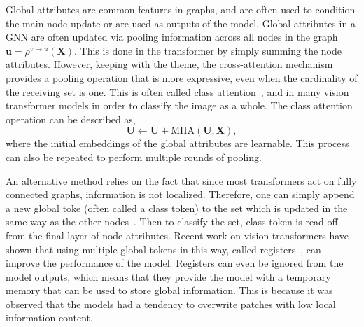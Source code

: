 Global attributes are common features in graphs, and are often used to condition the main node update or are used as outputs of the model.
Global attributes in a GNN are often updated via pooling information across all nodes in the graph $ \mathbf{u} = \rho^{v \to u}(\mathbf{X})$.
This is done in the transformer by simply summing the node attributes.
However, keeping with the theme, the cross-attention mechanism provides a pooling operation that is more expressive, even when the cardinality of the receiving set is one.
This is often called class attention~, and in many vision transformer models in order to classify the image as a whole.
The class attention operation can be described as,
\begin{equation}
    \mathbf{U} \leftarrow \mathbf{U} + \text{MHA}(\mathbf{U}, \mathbf{X}),
\end{equation}
where the initial embeddings of the global attributes are learnable.
This process can also be repeated to perform multiple rounds of pooling.

An alternative method relies on the fact that since most transformers act on fully connected graphs, information is not localized.
Therefore, one can simply append a new global toke (often called a class token) to the set which is updated in the same way as the other nodes~.
Then to classify the set, class token is read off from the final layer of node attributes.
Recent work on vision transformers have shown that using multiple global tokens in this way, called registers~, can improve the performance of the model.
Registers can even be ignored from the model outputs, which means that they provide the model with a temporary memory that can be used to store global information.
This is because it was observed that the models had a tendency to overwrite patches with low local information content.

